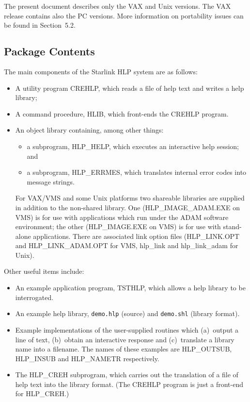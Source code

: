 \documentclass[11pt,nolof]{starlink}
\begin{document}
The present document describes only the VAX and Unix versions.  The
VAX release contains also the PC versions.  More information
on portability issues can be found in Section~5.2.

\subsection{Package Contents}
The main components of the Starlink HLP system are as follows:
\begin{itemize}
\item A utility program CREHLP,
which reads a file of help text and writes a help library;
\item A command procedure, HLIB, which front-ends the
CREHLP program.
\item An object library containing, among other things:
   \begin{itemize}
   \item a subprogram, HLP\_HELP, which executes an interactive
   help session; and
   \item a subprogram, HLP\_ERRMES, which translates internal error
   codes into message strings.
   \end{itemize}
For VAX/VMS and some Unix platforms two shareable libraries are supplied
in addition to the non-shared library.  One
(HLP\_IMAGE\_ADAM.EXE on VMS) is for use with applications which run
under the ADAM software environment; the other
(HLP\_IMAGE.EXE on VMS) is for use with stand-alone applications.
There are associated link option files (HLP\_LINK.OPT and HLP\_LINK\_ADAM.OPT
for VMS, hlp\_link and hlp\_link\_adam for Unix).
\end{itemize}
Other useful items include:
\begin{itemize}
\item An example application program, TSTHLP, which allows a help
library to be interrogated.
\item An example help library, \texttt{demo.hlp} (source)
and \texttt{demo.shl} (library format).
\item Example implementations of the user-supplied routines which
(a)~output a line of text, (b)~obtain an interactive response and
(c)~translate a library name into a filename.  The
names of these examples are HLP\_OUTSUB, HLP\_INSUB and
HLP\_NAMETR respectively.
\item The HLP\_CREH subprogram, which carries out the translation of
a file of help text into the library format.  (The CREHLP program
is just a front-end for HLP\_CREH.)
\end{itemize}
\end{document}
